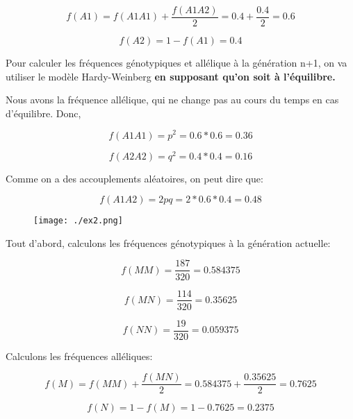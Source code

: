 \documentclass{article}
\begin{document}
\begin{equation}
f(A1) = f(A1A1) + \frac{f(A1A2)}{2} = 0.4 + \frac{0.4}{2} = 0.6
\end{equation}

\begin{equation}
f(A2) = 1-f(A1) = 0.4
\end{equation}

Pour calculer les fréquences génotypiques et allélique à la génération n+1, on va utiliser le modèle Hardy-Weinberg \textbf{en supposant qu'on soit à l'équilibre.}

Nous avons la fréquence allélique, qui ne change pas au cours du temps en cas d'équilibre. Donc,

\begin{equation}
f(A1A1) = p^2 = 0.6 * 0.6 = 0.36
\end{equation}

\begin{equation}
f(A2A2) = q^2 = 0.4*0.4 = 0.16
\end{equation}

Comme on a des accouplements aléatoires, on peut dire que:

\begin{equation}
f(A1A2) = 2pq = 2*0.6*0.4 = 0.48
\end{equation}

\begin{figure}[H]
\texttt{[image: ./ex2.png]}
\end{figure}

Tout d'abord, calculons les fréquences génotypiques à la génération actuelle:

\begin{equation}
f(MM) = \frac{187}{320} = 0.584375
\end{equation}

\begin{equation}
f(MN) = \frac{114}{320} = 0.35625
\end{equation}

\begin{equation}
f(NN) = \frac{19}{320} = 0.059375
\end{equation}

Calculons les fréquences alléliques:

\begin{equation}
f(M) = f(MM) + \frac{f(MN)}{2} = 0.584375 + \frac{0.35625}{2} = 0.7625
\end{equation}

\begin{equation}
f(N) = 1 - f(M) = 1 - 0.7625 = 0.2375
\end{equation}
\end{document}
